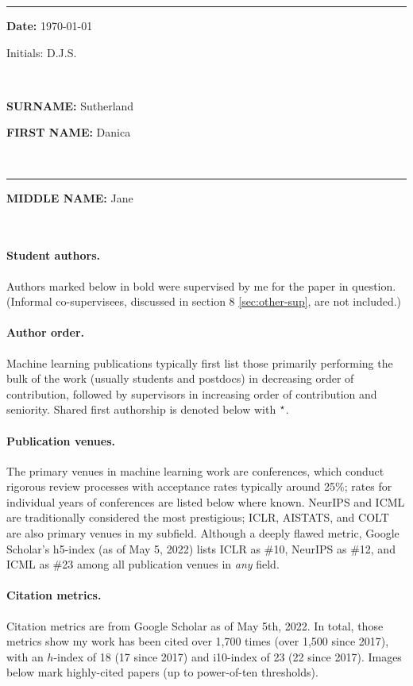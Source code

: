 \documentclass[10pt]{article}
\begin{document}
\newpage
{}\bigskip\rule{3.5in}{0mm}
\parbox[t]{2in}{{\bf Date:} \today}\parbox[t]{1in}{Initials: D.J.S.} \\
\noindent\parbox[t]{.5in}{\mbox{}}\parbox[t]{3.04in}{{\bf SURNAME:}
  Sutherland}\parbox[t]{3.2in}{{\bf FIRST NAME:} Danica}
\\\rule{3.54in}{0mm}\parbox[t]{3.2in}{{\bf MIDDLE NAME:} Jane}
\\[5mm]
\setcounter{section}{0}
\vspace{12pt}

\paragraph{Student authors.} Authors marked below in bold were supervised by me for the paper in question.
(Informal co-supervisees, discussed in section 8 \ref{sec:other-sup}, are not included.)

\paragraph{Author order.} Machine learning publications typically first list those primarily performing the bulk of the work (usually students and postdocs) in decreasing order of contribution,
followed by supervisors in increasing order of contribution and seniority.
Shared first authorship is denoted below with $^\star$.

\paragraph{Publication venues.} The primary venues in machine learning work are conferences,
which conduct rigorous review processes with acceptance rates typically around 25\%;
rates for individual years of conferences are listed below where known.
NeurIPS and ICML are traditionally considered the most prestigious;
ICLR, AISTATS, and COLT are also primary venues in my subfield.
Although a deeply flawed metric, Google Scholar's h5-index (as of May 5, 2022) lists ICLR as \#10, NeurIPS as \#12, and ICML as \#23 among all publication venues in \emph{any} field.

\paragraph{Citation metrics.}
Citation metrics are from Google Scholar as of May 5th, 2022.
In total, those metrics show my work has been cited over 1,700 times (over 1,500 since 2017),
with an $h$-index of 18 (17 since 2017) and i10-index of 23 (22 since 2017).
Images below mark highly-cited papers (up to power-of-ten thresholds).
\end{document}
